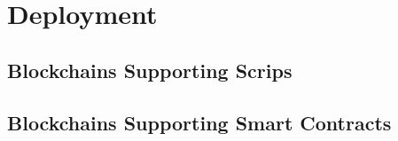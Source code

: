 \section{Deployment}
\label{sec:deployment}

\subsection{Blockchains Supporting Scrips}

\subsection{Blockchains Supporting Smart Contracts}